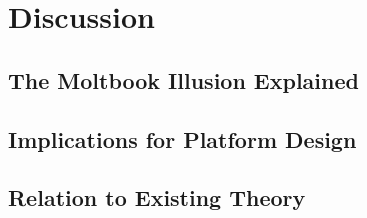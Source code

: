 \section{Discussion}
\label{sec:discussion}

\subsection{The Moltbook Illusion Explained}


\subsection{Implications for Platform Design}


\subsection{Relation to Existing Theory}

